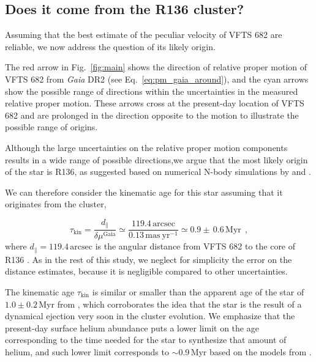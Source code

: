 \documentclass[a4paper,fleqn,usenatbib]{mnras}
\newcommand{\todo}[1]{{\large $\blacksquare$~\textbf{\color{red}[#1]}}~$\blacksquare$}
\DeclareRobustCommand{\Eqref}[1]{Eq.~\ref{#1}}
\DeclareRobustCommand{\Figref}[1]{Fig.~\ref{#1}}
\begin{document}
\subsection{Does it come from the R136 cluster?}
\label{sec:r136_origin}

Assuming that the best estimate of the peculiar velocity of VFTS 682
are reliable, we now address the question of its likely origin.

The red arrow in \Figref{fig:main} shows the direction of relative proper motion of
VFTS 682 from \emph{Gaia} DR2 (see \Eqref{eq:pm_gaia_around}), and the cyan arrows show the possible
range of directions within the uncertainties in the measured relative proper
motion. These arrows cross at the present-day location of VFTS 682 and
are prolonged in the direction opposite to the motion to illustrate
the possible range of origins. %

Although the large uncertainties on the relative proper motion
components results in a wide range of possible directions,we argue that the most likely origin of the star is R136,
as suggested based on numerical N-body simulations by \cite{fujii:11}
and \cite{banerjee:12}.

We can therefore consider the kinematic age for this star assuming
that it originates from the cluster,

\begin{equation}
  \label{eq:kin_age}
  \tau_\mathrm{kin} = \frac{d_\parallel}{\delta\mu^\mathrm{Gaia}} \simeq
  \frac{119.4\,\mathrm{arcsec}}{0.13\,\mathrm{mas\ yr^{-1}}} \simeq 0.9\pm\,0.6\, \mathrm{Myr} \ \ ,
\end{equation}
where $d_\parallel = 119.4\,\mathrm{arcsec}$ is the angular distance from VFTS 682 to
the core of R136 \citep[corresponding to $\sim$29\,pc at LMC distance,][]{bestenlehner:11}.
As in the rest of this study, we neglect for
simplicity the error on the distance estimates, because it is negligible compared to other uncertainties.

The kinematic age $\tau_\mathrm{kin}$ is similar or smaller than the apparent age
of the star of $1.0\pm 0.2$\,Myr from \cite{schneider:18}, which
corroborates the idea that the star is the result of a dynamical
ejection very soon in the cluster evolution. We emphasize that the
present-day surface helium abundance
\citep[$Y\simeq0.5$,][]{bestenlehner:11, rubio-diez:17} puts a lower
limit on the age corresponding to the time needed for the star to
synthesize that amount of helium, and such lower limit corresponds to
$\sim$0.9\,Myr based on the models from \cite{kohler:15}.
\end{document}
